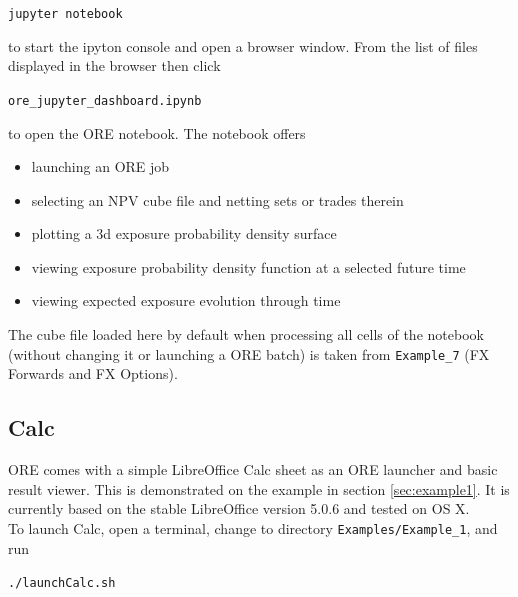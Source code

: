 \documentclass[12pt, a4paper]{article}
\begin{document}
\medskip
\centerline{\tt jupyter notebook}
\medskip

to start the ipyton console and open a browser window. From the list of files displayed in the browser then click

\medskip
\centerline{\tt ore\_jupyter\_dashboard.ipynb} 
\medskip

to open the ORE notebook. The notebook offers
\begin{itemize}
\item launching an ORE job
\item selecting an NPV cube file and netting sets or trades therein
\item plotting a 3d exposure probability density surface
\item viewing exposure probability density function at a selected future time
\item viewing expected exposure evolution through time  
\end{itemize}

The cube file loaded here by default when processing all cells of the notebook (without changing it or launching a ORE
batch) is taken from {\tt Example\_7} (FX Forwards and FX Options).


\subsection{Calc}\label{sec:calc}

ORE comes with a simple LibreOffice Calc \cite{LO} sheet as an ORE launcher and basic result viewer. This is
demonstrated on the example in section \ref{sec:example1}. It is currently based on the stable LibreOffice version 5.0.6
and tested on OS X. \\

To launch Calc, open a terminal, change to directory {\tt Examples/Example\_1}, and run

\medskip
{\centerline{\tt ./launchCalc.sh} }
\medskip
\end{document}
